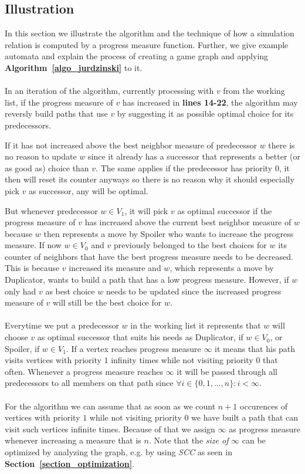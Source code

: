 \documentclass[12pt,oneside,bibliography=totoc,abstracton]{scrartcl}
\newcommand{\sectionref}[1]{\textbf{Section~\ref{#1}}}
\newcommand{\algoref}[1]{\textbf{Algorithm~\ref{#1}}}
\begin{document}
\subsection{Illustration}\label{section_illustration}
In this section we illustrate the algorithm and the technique of how a simulation relation is
computed by a progress measure function. Further, we give example automata and explain the process of
creating a game graph and applying \algoref{algo_jurdzinski} to it.\\\\
In an iteration of the algorithm, currently processing with $v$ from the working list,
if the progress measure of $v$ has increased in \textbf{lines 14-22}, the algorithm may reversly build paths
that use $v$ by suggesting it as possible optimal choice for its predecessors.

If it has not increased above the best neighbor measure of predecessor $w$ there is no reason to update
$w$ since it already has a successor that represents a better (or as good as) choice than $v$.
The same applies if the predecessor has priority $0$, it then will reset its counter anyways so there is no
reason why it should especially pick $v$ as successor, any will be optimal.

But whenever predecessor $w \in V_1$, it will pick $v$ as optimal successor if the progress measure of $v$
has increased above the current best neighbor measure of $w$ because $w$ then represents a move by
Spoiler who wants to increase the progress measure. If now $w \in V_0$ and $v$ previously belonged to the best
choices for $w$ its counter of neighbors that have the best progress measure needs to be
decreased. This is because $v$ increased its measure and $w$, which represents a move by Duplicator, wants to build a path that has
a low progress measure. However, if $w$ only had $v$ as best choice $w$ needs to be updated since the increased progress
measure of $v$ will still be the best choice for $w$.\\\\
Everytime we put a predecessor $w$ in the working list it represents that $w$ will choose $v$ as optimal successor that
suits his needs as Duplicator, if $w \in V_0$, or Spoiler, if $w \in V_1$.
If a vertex reaches progress measure $\infty$ it means that his path visits vertices with priority $1$ infinity times while
not visiting priority $0$ that often. Whenever a progress measure reaches $\infty$ it will be passed through all
predecessors to all members on that path since $\forall i \in \{0, 1, \ldots, n\}: i < \infty$.\\\\
For the algorithm we can assume that as soon as we count $n + 1$ occurences of vertices with priority $1$ while not
visiting priority $0$ we have built a path that can visit such vertices infinite times. Because of that we assign $\infty$ as
progress measure whenever increasing a measure that is $n$. Note that the \textit{size of} $\infty$ can be optimized
by analyzing the graph, e.g. by using \textit{SCC} as seen in \sectionref{section_optimization}.
\end{document}
